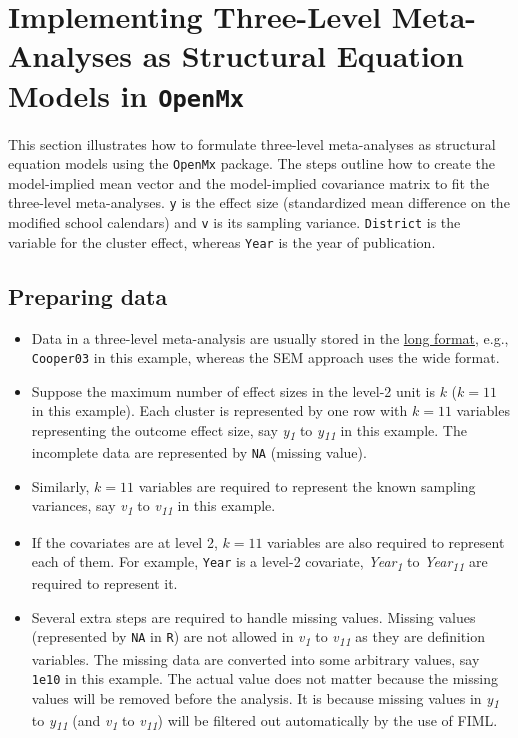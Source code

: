 \documentclass[11pt]{article}
\begin{document}
\section{Implementing Three-Level Meta-Analyses as Structural Equation Models in \texttt{OpenMx}}
\label{sec:org909d457}
This section illustrates how to formulate three-level meta-analyses as structural equation models using the \texttt{OpenMx} package. The steps outline how to create the model-implied mean vector and the model-implied covariance matrix to fit the three-level meta-analyses. \texttt{y} is the effect size (standardized mean difference on the modified school calendars) and \texttt{v} is its sampling variance. \texttt{District} is the variable for the cluster effect, whereas \texttt{Year} is the year of publication. 

\subsection{Preparing data}
\label{sec:org5b841e5}
\begin{itemize}
\item Data in a three-level meta-analysis are usually stored in the \href{http://wiki.stdout.org/rcookbook/Manipulating\%20data/Converting\%20data\%20between\%20wide\%20and\%20long\%20format/}{long format}, e.g., \texttt{Cooper03} in this example, whereas the SEM approach uses the wide format.
\item Suppose the maximum number of effect sizes in the level-2 unit is \(k\) (\(k=11\) in this example). Each cluster is represented by one row with \(k=11\) variables representing the outcome effect size, say \emph{y\textsubscript{1}} to \emph{y\textsubscript{11}} in this example. The incomplete data are represented by \texttt{NA} (missing value).
\item Similarly, \(k=11\) variables are required to represent the known sampling variances, say \emph{v\textsubscript{1}} to \emph{v\textsubscript{11}} in this example.
\item If the covariates are at level 2, \(k=11\) variables are also required to represent each of them. For example, \texttt{Year} is a level-2 covariate, \emph{Year\textsubscript{1}} to \emph{Year\textsubscript{11}} are required to represent it.
\item Several extra steps are required to handle missing values. Missing values (represented by \texttt{NA} in \texttt{R}) are not allowed in \emph{v\textsubscript{1}} to \emph{v\textsubscript{11}} as they are definition variables. The missing data are converted into some arbitrary values, say \texttt{1e10} in this example. The actual value does not matter because the missing values will be removed before the analysis. It is because missing values in \emph{y\textsubscript{1}} to \emph{y\textsubscript{11}} (and \emph{v\textsubscript{1}} to \emph{v\textsubscript{11}}) will be filtered out automatically by the use of FIML.
\end{itemize}
\end{document}
